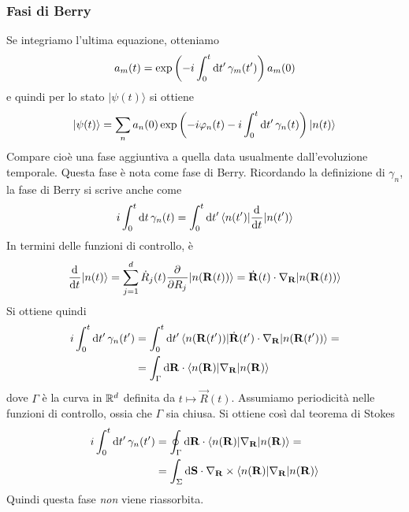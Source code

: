 \documentclass[a4paper, 11pt]{article}
\renewcommand{\ket}[1]{| #1\rangle}
\begin{document}
\subsubsection{Fasi di Berry}
Se integriamo l'ultima equazione, otteniamo
\[a_m(t)=\exp\left(-i\int_{0}^{t}\mathrm{d} t'\,\gamma_m(t')\right)a_m(0)\]
e quindi per lo stato $\ket{\psi(t)}$ si ottiene
\[\ket{\psi(t)}=\sum_{n}a_n(0)\exp\left(-i\varphi_n(t)-i\int_0^t\d t'\,\gamma_n(t)\right)\ket{n(t)}\]
Compare cioè una fase aggiuntiva a quella data usualmente dall'evoluzione temporale. Questa fase è nota come fase di Berry. Ricordando la definizione di $\gamma_n$, la fase di Berry si scrive anche come
\[i\int_0^t\mathrm{d} t\,\gamma_n(t)=\int_0^t\mathrm{d} t'\,\langle n(t')|\dfrac{\mathrm{d} ^{}}{\mathrm{d} {t}^{}}|n(t')\rangle\]
In termini delle funzioni di controllo, è
\[\der{}{t}\ket{n(t)}=\sum_{j=1}^{d}\dot{R}_j(t)\pder{}{R_j}\ket{n(\vec{R}(t))}=\dot{\vec{R}}(t)\cdot\nabla_{\vec{R}}\ket{n(\vec{R}(t))}\]
Si ottiene quindi
\begin{align*}i\int_{0}^{t}\d t'\,\gamma_n(t')&=\int_{0}^{t}\d t'\,\braketop{n(\vec{R}(t'))}{\dot{\vec{R}}(t')\cdot\nabla_{\vec{R}}}{n(\vec{R}(t'))}=\\&=\int_{\Gamma}\d \vec{R}\cdot\braketop{n(\vec{R})}{\nabla_{\vec{R}}}{n(\vec{R})}\end{align*}
dove $\Gamma$ è la curva in $\mathbb{R} ^d$ definita da $t\mapsto \vec{R}(t)$. Assumiamo periodicità nelle funzioni di controllo, ossia che $\Gamma $ sia chiusa. Si ottiene così dal teorema di Stokes
\begin{align*}
	i\int_0^t\d t'\,\gamma_n(t')&=\oint_\Gamma\d \vec{R}\cdot\braketop{n(\vec{R})}{\nabla_{\vec{R}}}{n(\vec{R})}=\\&=\int_{\Sigma}\d \vec{S}\cdot\nabla_{\vec{R}}\times\braketop{n(\vec{R})}{\nabla_{\vec{R}}}{n(\vec{R})}
\end{align*}
Quindi questa fase \emph{non} viene riassorbita.
\end{document}
